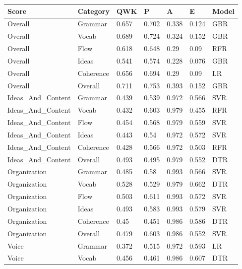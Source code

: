 \begin{table}[h]
\centering
\begin{tabular}{lllllll}
\toprule
Score               & Category  & QWK   & P     & A     & E     & Model \\ \midrule
Overall             & Grammar   & 0.657 & 0.702 & 0.338 & 0.124 & GBR   \\
Overall             & Vocab     & 0.689 & 0.724 & 0.324 & 0.152 & GBR   \\
Overall             & Flow      & 0.618 & 0.648 & 0.29  & 0.09  & RFR   \\
Overall             & Ideas     & 0.541 & 0.574 & 0.228 & 0.076 & GBR   \\
Overall             & Coherence & 0.656 & 0.694 & 0.29  & 0.09  & LR    \\
Overall             & Overall   & 0.711 & 0.753 & 0.393 & 0.152 & GBR   \\
Ideas\_And\_Content & Grammar   & 0.439 & 0.539 & 0.972 & 0.566 & SVR   \\
Ideas\_And\_Content & Vocab     & 0.432 & 0.603 & 0.979 & 0.455 & RFR   \\
Ideas\_And\_Content & Flow      & 0.454 & 0.568 & 0.979 & 0.559 & SVR   \\
Ideas\_And\_Content & Ideas     & 0.443 & 0.54  & 0.972 & 0.572 & SVR   \\
Ideas\_And\_Content & Coherence & 0.428 & 0.566 & 0.972 & 0.503 & RFR   \\
Ideas\_And\_Content & Overall   & 0.493 & 0.495 & 0.979 & 0.552 & DTR   \\
Organization        & Grammar   & 0.485 & 0.58  & 0.993 & 0.566 & SVR   \\
Organization        & Vocab     & 0.528 & 0.529 & 0.979 & 0.662 & DTR   \\
Organization        & Flow      & 0.503 & 0.611 & 0.993 & 0.572 & SVR   \\
Organization        & Ideas     & 0.493 & 0.583 & 0.993 & 0.579 & SVR   \\
Organization        & Coherence & 0.45  & 0.451 & 0.986 & 0.586 & DTR   \\
Organization        & Overall   & 0.479 & 0.603 & 0.986 & 0.552 & SVR   \\
Voice               & Grammar   & 0.372 & 0.515 & 0.972 & 0.593 & LR    \\
Voice               & Vocab     & 0.456 & 0.461 & 0.986 & 0.607 & DTR   \\

\end{tabular}
\end{table}
